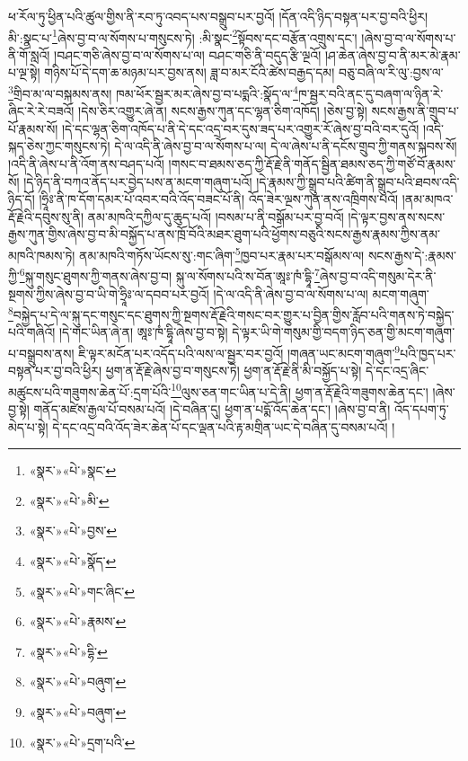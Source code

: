ཕ་རོལ་ཏུ་ཕྱིན་པའི་ཚུལ་གྱིས་ནི་རབ་ཏུ་འབད་པས་བསྒྲུབ་པར་བྱའོ། །དོན་འདི་ཉིད་བསྟན་པར་བྱ་བའི་ཕྱིར། མི་:སྣང་པ་\footnote{«སྣར་»«པེ་»སྣང་}ཞེས་བྱ་བ་ལ་སོགས་པ་གསུངས་ཏེ། :མི་སྣང་\footnote{«སྣར་»«པེ་»མི་}སྟོབས་དང་བརྩོན་འགྲུས་དང་། །ཞེས་བྱ་བ་ལ་སོགས་པ་ནི་གོ་སླའོ། །བཤང་གཅི་ཞེས་བྱ་བ་ལ་སོགས་པ་ལ། བཤང་གཅི་ནི་བདུད་རྩི་ལྔའོ། །ཤ་ཆེན་ཞེས་བྱ་བ་ནི་མར་མེ་རྣམ་པ་ལྔ་སྟེ། གཉིས་པོ་དེ་དག་ཆ་མཉམ་པར་བྱས་ནས། ཟླ་བ་མར་ངོའི་ཚེས་བརྒྱད་དམ། བཅུ་བཞི་ལ་རི་ལུ་:བྱས་ལ་\footnote{«སྣར་»«པེ་»བྱས་}གྲིབ་མ་ལ་བསྐམས་ནས། ཁམ་ཕོར་སྦྱར་མར་ཞེས་བྱ་བ་པདྨའི་:སྣོད་ལ་\footnote{«སྣར་»«པེ་»སྣོད་}ཁ་སྦྱར་བའི་ནང་དུ་བཞག་ལ་ཉིན་རེ་ཞིང་རེ་རེ་བཟའོ། །དེས་ཅིར་འགྱུར་ཞེ་ན། སངས་རྒྱས་ཀུན་དང་ལྷན་ཅིག་འཁོད། །ཅེས་བྱ་སྟེ། སངས་རྒྱས་ནི་གྲུབ་པ་པོ་རྣམས་སོ། །དེ་དང་ལྷན་ཅིག་འཁོད་པ་ནི་དེ་དང་འདྲ་བར་དུས་ཟད་པར་འགྱུར་རོ་ཞེས་བྱ་བའི་བར་དུའོ། །འདི་སྐད་ཅེས་ཀྱང་གསུངས་ཏེ། དེ་ལ་འདི་ནི་ཞེས་བྱ་བ་ལ་སོགས་པ་ལ། དེ་ལ་ཞེས་པ་ནི་དངོས་གྲུབ་ཀྱི་གནས་སྐབས་སོ། །འདི་ནི་ཞེས་པ་ནི་འོག་ནས་བཤད་པའོ། །གསང་བ་ཐམས་ཅད་ཀྱི་རྡོ་རྗེ་ནི་གནོད་སྦྱིན་ཐམས་ཅད་ཀྱི་གཙོ་བོ་རྣམས་སོ། །དེ་ཉིད་ནི་བཀའ་ནོད་པར་བྱེད་པས་ན་མངག་གཞུག་པའོ། །དེ་རྣམས་ཀྱི་སྒྲུབ་པའི་ཚིག་ནི་སྒྲུབ་པའི་ཐབས་འདི་ཉིད་དོ། །ཧྲཱིཿ་ནི་ཁ་དོག་དམར་པོ་འབར་བའི་འོད་བཟང་པོ་ནི། འོད་ཟེར་ལྔས་ཀུན་ནས་འཁྲིགས་པའོ། །ནམ་མཁའ་རྡོ་རྗེའི་དབུས་སུ་ནི། ནམ་མཁའི་དཀྱིལ་དུ་ཆུད་པའོ། །བསམ་པ་ནི་བསྒོམ་པར་བྱ་བའོ། །དེ་ལྟར་བྱས་ནས་སངས་རྒྱས་ཀུན་གྱིས་ཞེས་བྱ་བ་མི་བསྐྱོད་པ་ནས་ཁྲོ་བོའི་མཐར་ཐུག་པའི་ཕྱོགས་བཅུའི་སངས་རྒྱས་རྣམས་ཀྱིས་ནམ་མཁའི་ཁམས་ཏེ། ནམ་མཁའི་གཏོས་ཡོངས་སུ་:གང་ཞིག་\footnote{«སྣར་»«པེ་»གང་ཞིང་}ཁྱབ་པར་རྣམ་པར་བསྒོམས་ལ། སངས་རྒྱས་དེ་:རྣམས་ཀྱི་\footnote{«སྣར་»«པེ་»རྣམས་}སྐུ་གསུང་ཐུགས་ཀྱི་གནས་ཞེས་བྱ་བ། སྐུ་ལ་སོགས་པའི་ས་བོན་ཨཱཿ་ཁཾ་དྷཱི་\footnote{«སྣར་»«པེ་»དྷི་}ཞེས་བྱ་བ་འདི་གསུམ་དེར་ནི་སྔགས་ཀྱིས་ཞེས་བྱ་བ་ཡི་གེ་ཧྲཱིཿ་ལ་དབབ་པར་བྱའོ། །དེ་ལ་འདི་ནི་ཞེས་བྱ་བ་ལ་སོགས་པ་ལ། མངག་གཞུག་\footnote{«སྣར་»«པེ་»བཞུག་}བསྐྱེད་པ་དེ་ལ་སྐུ་དང་གསུང་དང་ཐུགས་ཀྱི་སྔགས་རྡོ་རྗེའི་གསང་བར་གྱུར་པ་བྱིན་གྱིས་རློབ་པའི་གནས་ཏེ་བསྐྱེད་པའི་གཞིའོ། །དེ་གང་ཡིན་ཞེ་ན། ཨཱཿ་ཁཾ་དྷཱི་ཞེས་བྱ་བ་སྟེ། དེ་ལྟར་ཡི་གེ་གསུམ་གྱི་བདག་ཉིད་ཅན་གྱི་མངག་གཞུག་པ་བསྒྲུབས་ནས། ཇི་ལྟར་མངོན་པར་འདོད་པའི་ལས་ལ་སྦྱར་བར་བྱའོ། །གཞན་ཡང་མངག་གཞུག་\footnote{«སྣར་»«པེ་»བཞུག་}པའི་ཁྱད་པར་བསྟན་པར་བྱ་བའི་ཕྱིར། ཕྱག་ན་རྡོ་རྗེ་ཞེས་བྱ་བ་གསུངས་ཏེ། ཕྱག་ན་རྡོ་རྗེ་ནི་མི་བསྐྱོད་པ་སྟེ། དེ་དང་འདྲ་ཞིང་མཚུངས་པའི་གཟུགས་ཆེན་པོ་:དྲག་པོའི་\footnote{«སྣར་»«པེ་»དྲག་པའི་}ལུས་ཅན་གང་ཡིན་པ་དེ་ནི། ཕྱག་ན་རྡོ་རྗེའི་གཟུགས་ཆེན་དང་། །ཞེས་བྱ་སྟེ། གནོད་མཛེས་རྒྱལ་པོ་བསམ་པའོ། །དེ་བཞིན་དུ། ཕྱག་ན་པདྨོ་འོད་ཆེན་དང་། །ཞེས་བྱ་བ་ནི། འོད་དཔག་ཏུ་མེད་པ་སྟེ། དེ་དང་འདྲ་བའི་འོད་ཟེར་ཆེན་པོ་དང་ལྡན་པའི་རྟ་མགྲིན་ཡང་དེ་བཞིན་དུ་བསམ་པའོ། །
